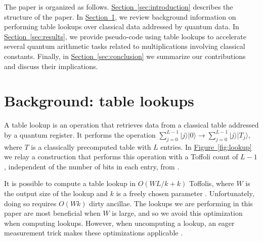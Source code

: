 \documentclass[onecolumn,unpublished]{quantumarticle}
\theoremstyle{definition}
\theoremstyle{definition}
\theoremstyle{definition}
\renewcommand{\sec}[1]{\hyperref[sec:#1]{Section~\ref*{sec:#1}}}
\newcommand{\fig}[1]{\hyperref[fig:#1]{Figure~\ref*{fig:#1}}}
\begin{document}
The paper is organized as follows.
\sec{introduction} describes the structure of the paper.
In \sec{background}, we review background information on performing table lookups over classical data addressed by quantum data.
In \sec{results}, we provide pseudo-code using  table lookups to accelerate several quantum arithmetic tasks related to multiplications involving classical constants.
Finally, in \sec{conclusion} we summarize our contributions and discuss their implications.



\section{Background: table lookups}
\label{sec:background}

A table lookup is an operation that retrieves data from a classical table addressed by a quantum register.
It performs the operation $\sum_{j=0}^{L-1} |j\rangle|0\rangle \rightarrow \sum_{j=0}^{L-1} |j\rangle|T_j\rangle$, where $T$ is a classically precomputed table with $L$ entries.
In \fig{lookup} we relay a construction that performs this operation with a Toffoli count of $L-1$, independent of the number of bits in each entry, from \cite{babbush2018}.

It is possible to compute a table lookup in $O(WL/k + k)$ Toffolis, where $W$ is the output size of the lookup and $k$ is a freely chosen parameter \cite{low2018qrom}.
Unfortunately, doing so requires $O(Wk)$ dirty ancillae.
The lookups we are performing in this paper are most beneficial when $W$ is large, and so we avoid this optimization when computing lookups.
However, when uncomputing a lookup, an eager measurement trick makes these optimizations applicable \cite{berry2019qubitization}.
\end{document}

